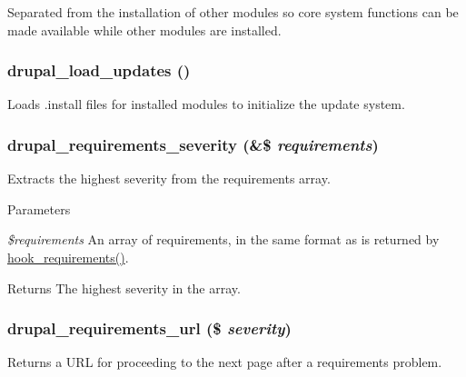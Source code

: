 Separated from the installation of other modules so core system functions can be made available while other modules are installed. \hypertarget{install_8inc_a0c6d0aed425d08e6001378191d6bc1d9}{
\subsubsection[{drupal\_\-load\_\-updates}]{\setlength{\rightskip}{0pt plus 5cm}drupal\_\-load\_\-updates ()}}
\label{install_8inc_a0c6d0aed425d08e6001378191d6bc1d9}
Loads .install files for installed modules to initialize the update system. \hypertarget{install_8inc_aa9ea0f7df004333efbdd03025f5a9c94}{
\subsubsection[{drupal\_\-requirements\_\-severity}]{\setlength{\rightskip}{0pt plus 5cm}drupal\_\-requirements\_\-severity (\&\$ {\em requirements})}}
\label{install_8inc_aa9ea0f7df004333efbdd03025f5a9c94}
Extracts the highest severity from the requirements array.


\begin{DoxyParams}{Parameters}
\item[{\em \$requirements}]An array of requirements, in the same format as is returned by \hyperlink{group__hooks_ga3cff06c700ccb873cfce71fc378e7675}{hook\_\-requirements()}.\end{DoxyParams}
\begin{DoxyReturn}{Returns}
The highest severity in the array. 
\end{DoxyReturn}
\hypertarget{install_8inc_aa26d690c87ca7a7a2aedd9cd4679274a}{
\subsubsection[{drupal\_\-requirements\_\-url}]{\setlength{\rightskip}{0pt plus 5cm}drupal\_\-requirements\_\-url (\$ {\em severity})}}
\label{install_8inc_aa26d690c87ca7a7a2aedd9cd4679274a}
Returns a URL for proceeding to the next page after a requirements problem.

